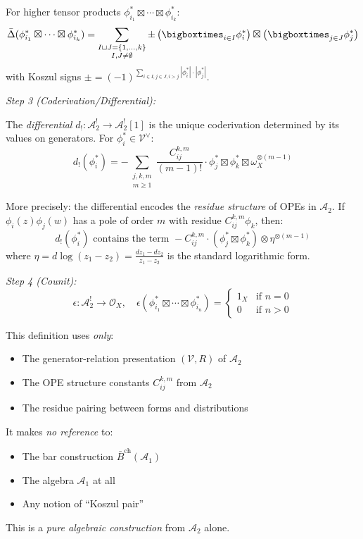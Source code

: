 \begin{definition}
For higher tensor products $\phi_{i_1}^* \boxtimes \cdots \boxtimes \phi_{i_k}^*$:
\[\bar{\Delta}(\phi_{i_1}^* \boxtimes \cdots \boxtimes \phi_{i_k}^*) = \sum_{\substack{I \sqcup J = \{1,\ldots,k\} \\ I, J \neq \emptyset}} \pm \left(\bigboxtimes_{i \in I} \phi_i^*\right) \boxtimes \left(\bigboxtimes_{j \in J} \phi_j^*\right)\]
with Koszul signs $\pm = (-1)^{\sum_{i \in I, j \in J, i > j} |\phi_i^*| \cdot |\phi_j^*|}$.

\medskip
\noindent\emph{Step 3 (Coderivation/Differential):}

The \emph{differential} $d_!: \mathcal{A}_2^! \to \mathcal{A}_2^![1]$ is the unique coderivation determined by its values on generators. For $\phi_i^* \in \mathcal{V}^{\vee}$:
\[d_!(\phi_i^*) = -\sum_{\substack{j,k,m \\ m \geq 1}} \frac{C_{ij}^{k,m}}{(m-1)!} \cdot \phi_j^* \boxtimes \phi_k^* \boxtimes \omega_X^{\otimes (m-1)}\]

More precisely: the differential encodes the \emph{residue structure} of OPEs in $\mathcal{A}_2$. If $\phi_i(z)\phi_j(w)$ has a pole of order $m$ with residue $C_{ij}^{k,m}\phi_k$, then:
\[d_!(\phi_i^*) \text{ contains the term } -C_{ij}^{k,m} \cdot (\phi_j^* \boxtimes \phi_k^*) \otimes \eta^{\otimes(m-1)}\]
where $\eta = d\log(z_1 - z_2) = \frac{dz_1 - dz_2}{z_1 - z_2}$ is the standard logarithmic form.

\medskip
\noindent\emph{Step 4 (Counit):}
\[\epsilon: \mathcal{A}_2^! \to \mathcal{O}_X, \quad \epsilon(\phi_{i_1}^* \boxtimes \cdots \boxtimes \phi_{i_n}^*) = 
\begin{cases}
1_X & \text{if } n = 0 \\
0 & \text{if } n > 0
\end{cases}\]
\end{definition}

\begin{remark}[Independence]\label{rem:independence-construction}
This definition uses \emph{only}:
\begin{itemize}
\item The generator-relation presentation $(\mathcal{V}, R)$ of $\mathcal{A}_2$
\item The OPE structure constants $C_{ij}^{k,m}$ from $\mathcal{A}_2$
\item The residue pairing between forms and distributions
\end{itemize}

It makes \emph{no reference} to:
\begin{itemize}
\item The bar construction $\bar{B}^{\mathrm{ch}}(\mathcal{A}_1)$
\item The algebra $\mathcal{A}_1$ at all
\item Any notion of ``Koszul pair''
\end{itemize}

This is a \emph{pure algebraic construction} from $\mathcal{A}_2$ alone.
\end{remark}



